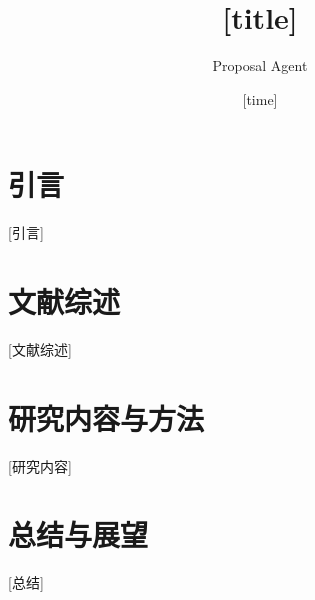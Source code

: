 \documentclass{phdproposal}
\title{[title]}
\author{Proposal Agent}
\date{[time]}
\begin{document}
\frontmatter

\maketitle

\clearpage
{}

\maketoc[nopagenum]

\clearpage
{}

\mainmatter


\chapter{引言}

[引言]

\chapter{文献综述}

[文献综述]

\chapter{研究内容与方法}

[研究内容]

\chapter{总结与展望}

[总结]


\backmatter




\end{document}
